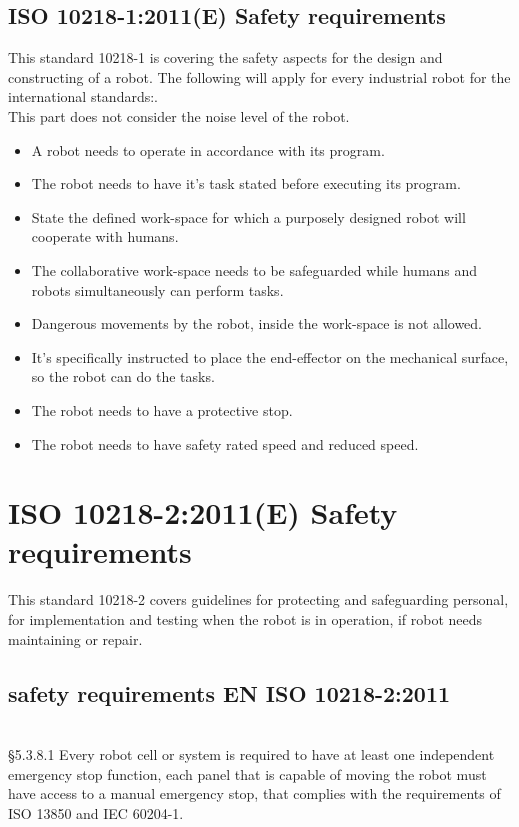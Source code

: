 \subsection{ISO 10218-1:2011(E) Safety requirements}
This standard 10218-1 is covering the safety aspects for the design and constructing of a robot.
The following will apply for every industrial robot for the international standards:\cite{Robotterdel1ds}.\\
This part does not consider the noise level of the robot.
\begin{itemize}
    \item A robot needs to operate in accordance with its program.
    \item The robot needs to have it's task stated before executing its program.
    \item State the defined work-space for which a purposely designed robot will cooperate with humans.
    \item The collaborative work-space needs to be safeguarded while humans and robots simultaneously can perform tasks.
    \item Dangerous movements by the robot, inside the work-space is not allowed.
    \item It's specifically instructed to place the end-effector on the mechanical surface, so the robot can do the tasks.
    \item The robot needs to have a protective stop.
    \item The robot needs to have safety rated speed and reduced speed.
\end{itemize}

\section{ISO 10218-2:2011(E) Safety requirements}
This standard 10218-2 covers guidelines for protecting and safeguarding personal, for implementation and testing when the robot is in operation, if robot needs maintaining or repair.

\subsection{safety requirements EN ISO 10218-2:2011}\\

\S5.3.8.1 Every robot cell or system is required to have at least one independent emergency stop function, each panel that is capable of moving the robot must have access to a manual emergency stop, that complies with the requirements of ISO 13850 and IEC 60204-1.\\ 

